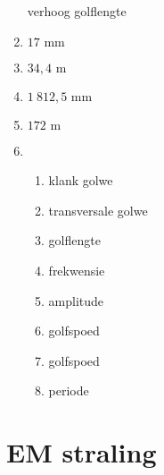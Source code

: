 \begin{multicols}{5}
\begin{enumerate}[itemsep=5pt, label=\textbf{\arabic*}. ]
verhoog golflengte
\item %
$17 \text{ mm}$
\item %
$34,4 \text{ m}$
\item %
$1~812,5 \text{ mm}$
\item %
$172 \text{ m}$
\item %
    \begin{enumerate}[noitemsep, label=\textbf{(\alph*)} ]
    \item klank golwe
    \item transversale golwe
\item golflengte
\item frekwensie
    \item amplitude
    \item golfspoed
\item golfspoed
\item periode
    \end{enumerate}
  \end{enumerate}
\end{multicols}

\section{EM straling}
% 
% 

